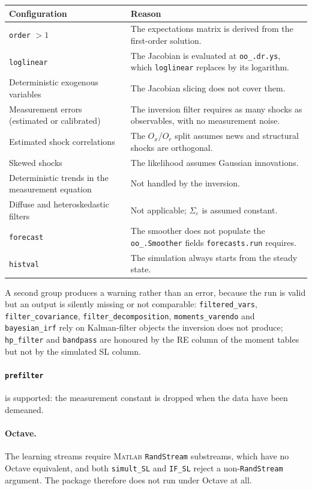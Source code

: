 \documentclass[11pt,a4paper]{article}
\newcommand{\command}[1]{\texttt{#1}}
\newcommand{\option}[1]{\texttt{#1}}
\newcommand{\field}[1]{\texttt{#1}}
\newcommand{\matlab}{\textsc{Matlab}}
\begin{document}
\begin{longtable}{p{5cm} p{9.5cm}}
\toprule
\textbf{Configuration} & \textbf{Reason} \\
\midrule
\endhead
\option{order} $> 1$ & The expectations matrix is derived from the first-order
solution. \\
\option{loglinear} & The Jacobian is evaluated at \field{oo\_.dr.ys}, which
\option{loglinear} replaces by its logarithm. \\
Deterministic exogenous variables & The Jacobian slicing does not cover them. \\
Measurement errors (estimated or calibrated) & The inversion filter requires as
many shocks as observables, with no measurement noise. \\
Estimated shock correlations & The $O_x$/$O_r$ split assumes news and
structural shocks are orthogonal. \\
Skewed shocks & The likelihood assumes Gaussian innovations. \\
Deterministic trends in the measurement equation & Not handled by the
inversion. \\
Diffuse and heteroskedastic filters & Not applicable; $\Sigma_\varepsilon$ is
assumed constant. \\
\option{forecast} & The smoother does not populate the \field{oo\_.Smoother}
fields \texttt{forecasts.run} requires. \\
\command{histval} & The simulation always starts from the steady state. \\
\bottomrule
\end{longtable}

\noindent
A second group produces a warning rather than an error, because the run is
valid but an output is silently missing or not comparable:
\option{filtered\_vars}, \option{filter\_covariance},
\option{filter\_decomposition}, \option{moments\_varendo} and
\option{bayesian\_irf} rely on Kalman-filter objects the inversion does not
produce; \option{hp\_filter} and \option{bandpass} are honoured by the RE
column of the moment tables but not by the simulated SL column.

\paragraph{\option{prefilter}} is supported: the measurement constant is
dropped when the data have been demeaned.

\paragraph{Octave.} The learning streams require \matlab{}
\texttt{RandStream} substreams, which have no Octave equivalent, and both
\texttt{simult\_SL} and \texttt{IF\_SL} reject a non-\texttt{RandStream}
argument. The package therefore does not run under Octave at all.
\end{document}

